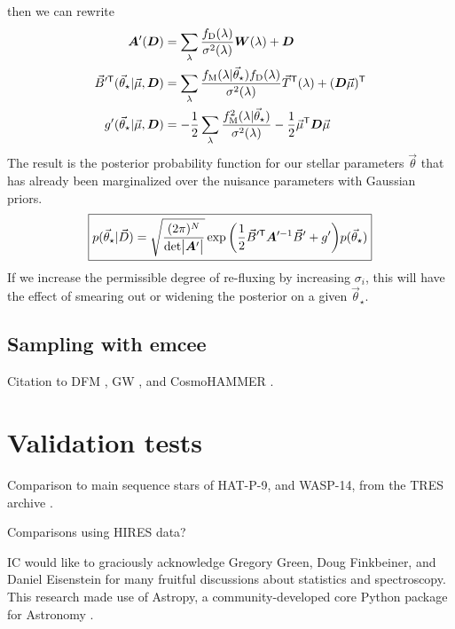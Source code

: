 \documentclass[preprint]{aastex} %
\newcommand{\vt}{\vec{\theta}}
\newcommand{\vstar}{\vt_{\star}}
\newcommand{\fM}{f_{\rm M}}
\newcommand{\fD}{f_{\rm D}}
\newcommand{\vD}{\vec{D}}
\newcommand{\trans}{\mathsf{T}}
\begin{document}
then we can rewrite
\begin{align}
  {\bm A}^\prime({\bm D}) &= \sum_\lambda \frac{\fD(\lambda)}{\sigma^2(\lambda)} {\bm W}(\lambda) + {\bm D}\\
  \vec{B}^{\prime\trans}(\vstar | \vec{\mu}, {\bm D}) &= \sum_\lambda \frac{\fM(\lambda | \vstar) \fD(\lambda)}{\sigma^2(\lambda)} \vec{T}^\trans(\lambda) + ({\bm D} \vec{\mu})^\trans \\
  g^\prime(\vstar | \vec{\mu}, {\bm D}) &= -\frac{1}{2} \sum_\lambda \frac{\fM^2(\lambda|\vstar)}{\sigma^2(\lambda)}- \frac{1}{2} \vec{\mu}^\trans {\bm D} \vec{\mu}\\
\end{align}
The result is the posterior probability function for our stellar parameters $\vt$ that has already been marginalized over the nuisance parameters with Gaussian priors.
\begin{equation}
  \boxed{
  p(\vstar | \vD) = \sqrt{\frac{(2 \pi )^N}{ {\rm det} \bigl |{\bm A}^\prime \bigr |}} \exp{ \left ( \frac{1}{2} \vec{B}^{\prime\trans} {\bm A}^{\prime -1} \vec{B}^\prime + g^\prime \right )} p(\vstar)
}
\end{equation}
If we increase the permissible degree of re-fluxing by increasing $\sigma_i$, this will have the effect of smearing out or widening the posterior on a given $\vstar$.

\subsection{Sampling with emcee}
Citation to DFM \citep{fhl+12}, GW \citep{gw10}, and CosmoHAMMER \citep{asa+13}.

\section{Validation tests}
Comparison to main sequence stars of HAT-P-9, and WASP-14, from the TRES archive \citep{tfs+12}.

Comparisons using HIRES data?


\acknowledgments
IC would like to graciously acknowledge Gregory Green, Doug Finkbeiner, and Daniel Eisenstein for many fruitful discussions about statistics and spectroscopy. This research made use of Astropy, a community-developed core Python package for Astronomy \citep{art+13}.

%
%



\end{document}
